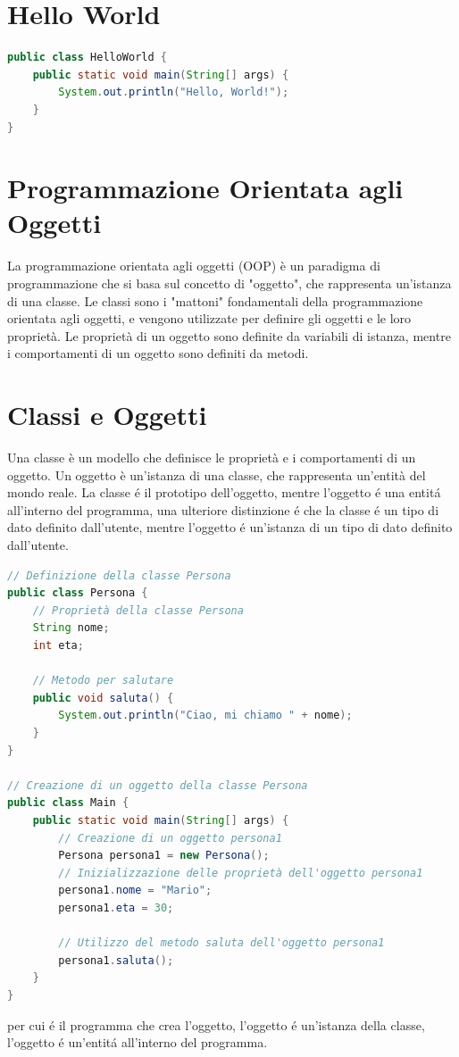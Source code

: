 \documentclass[11pt]{article}
\begin{document}
\section{Hello World}
\begin{lstlisting}[language=Java]
public class HelloWorld {
    public static void main(String[] args) {
        System.out.println("Hello, World!");
    }
}
\end{lstlisting}
\section{Programmazione Orientata agli Oggetti}
La programmazione orientata agli oggetti (OOP) è un paradigma di programmazione che si basa sul concetto di "oggetto", che rappresenta un'istanza di una classe.
Le classi sono i "mattoni" fondamentali della programmazione orientata agli oggetti, e vengono utilizzate per definire gli oggetti e le loro proprietà.
Le proprietà di un oggetto sono definite da variabili di istanza, mentre i comportamenti di un oggetto sono definiti da metodi.
\section{Classi e Oggetti}
Una classe è un modello che definisce le proprietà e i comportamenti di un oggetto.
Un oggetto è un'istanza di una classe, che rappresenta un'entità del mondo reale.
La classe é il prototipo dell'oggetto, mentre l'oggetto é una entitá all'interno del programma, una ulteriore distinzione é che la classe é un tipo di dato definito dall'utente, mentre l'oggetto é un'istanza di un tipo di dato definito dall'utente.

\begin{lstlisting}[language=Java]
// Definizione della classe Persona
public class Persona {
    // Proprietà della classe Persona
    String nome;
    int eta;

    // Metodo per salutare
    public void saluta() {
        System.out.println("Ciao, mi chiamo " + nome);
    }
}

// Creazione di un oggetto della classe Persona
public class Main {
    public static void main(String[] args) {
        // Creazione di un oggetto persona1
        Persona persona1 = new Persona();
        // Inizializzazione delle proprietà dell'oggetto persona1
        persona1.nome = "Mario";
        persona1.eta = 30;

        // Utilizzo del metodo saluta dell'oggetto persona1
        persona1.saluta();
    }
}
\end{lstlisting}
per cui é il programma che crea l'oggetto, l'oggetto é un'istanza della classe, l'oggetto é un'entitá all'interno del programma.
\end{document}
